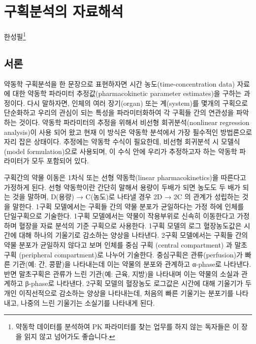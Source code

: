 \documentclass[
  11pt,
  krantz2, a4paper, twoside]{krantz}
\theoremstyle{definition}
\theoremstyle{definition}
\theoremstyle{definition}
\theoremstyle{definition}
\theoremstyle{remark}
\begin{document}
\hypertarget{ca-analysis}{%
\chapter{구획분석의 자료해석}\label{ca-analysis}}

\Large\hfill

한성필\footnote{약동학 데이터를 분석하여 PK 파라미터를 찾는 업무를 하지 않는 독자들은 이 장을 읽지 않고 넘어가도 좋습니다.}

\normalsize

\hypertarget{uxc11cuxb860-3}{%
\section{서론}\label{uxc11cuxb860-3}}

약동학 구획분석을 한 문장으로 표현하자면 시간 농도(time-concentration data) 자료에 대한 약동학 파라미터 추정값(pharmacokinetic parameter estimates)을 구하는 과정이다. 
다시 말하자면, 인체의 여러 장기(organ) 또는 계(system)를 몇개의 구획으로 단순화하고 우리의 관심이 되는 특성을 파라미터화하여 각 구획들 간의 연관성을 파악하는 것이다.
약동학 파라미터의 추정을 위해서 비선형 회귀분석(nonlinear regression analysis)이 사용 되어 왔고 현재 이 방식은 약동학 분석에서 가장 필수적인 방법론으로 자리 잡은 상태이다. 
추정에는 약동학 수식이 필요한데, 비선형 회귀분석 시 모델식(model formulation)으로 사용되며, 이 수식 안에 우리가 추정하고자 하는 약동학 파라미터가 모두 포함되어 있다. 

구획간의 약물 이동은 1차식 또는 선형 약동학(linear pharmacokinetics)을 따른다고 가정하게 된다. 
선형 약동학이란 간단히 말해서 용량이 두배가 되면 농도도 두 배가 되는 것을 말하며, D(용량) → C(농도)로 나타낼 경우 2D → 2C 의 관계가 성립하는 것을 말한다.
1구획 모델에서는 구획들 간의 약물 분포가 균일하다는 가정 하에 인체를 단일구획으로 기술한다.
1구획 모델에서는 약물이 작용부위로 신속히 이동한다고 가정하며 혈장을 자료 분석의 기준 구획으로 사용한다.
1구획 모델의 로그 혈장농도값은 시간에 대해 하나의 기울기로 감소하는 양상을 나타낸다.
2구획 모델에서는 구획들 간의 약물 분포가 균일하지 않다고 보며 인체를 중심 구획 (central compartment) 과 말초구획 (peripheral compartment)로 나누어 기술한다. 
중심구획은 관류(perfusion)가 빠른 기관(예: 간, 콩팥)을 나타내는데 이는 약물의 분포와 관계하고 α-phase로 나타낸다. 
반면 말초구획은 관류가 느린 기관(예: 근육, 지방)을 나타내며 이는 약물의 소실과 관계하고 β-phase로 나타낸다. 
2구획 모델의 혈장농도 로그값은 시간에 대해 기울기가 두 개인 이직선적으로 감소하는 양상을 나타내는데, 처음의 빠른 기울기는 분포기를 나타내고, 나중의 느린 기울기는 소실기를 나타내게 된다.
\end{document}
